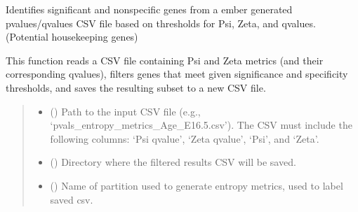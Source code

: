 \documentclass[letterpaper,10pt,english]{sphinxmanual}
\begin{document}
\begin{fulllineitems}
\label{\detokenize{ember_py:ember_py.top_genes.non_specific_to_partition}}
\pysigstartsignatures
\pysiglinewithargsret
{}
{\sphinxparamcomma {}\sphinxparamcomma {}\sphinxparamcomma {}\sphinxparamcomma {}\sphinxparamcomma {}}
{}
\pysigstopsignatures
\sphinxAtStartPar
Identifies significant and non\sphinxhyphen{}specific genes from a ember generated
p\sphinxhyphen{}values/q\sphinxhyphen{}values CSV file based on thresholds for Psi, Zeta, and q\sphinxhyphen{}values.
(Potential housekeeping genes)

\sphinxAtStartPar
This function reads a CSV file containing Psi and Zeta metrics (and their
corresponding q\sphinxhyphen{}values), filters genes that meet given significance and
specificity thresholds, and saves the resulting subset to a new CSV file.
\begin{quote}\begin{description}
\begin{itemize}
\item {} 
\sphinxAtStartPar
{} (\sphinxstyleliteralemphasis{\sphinxupquote{, }}) \textendash{} Path to the input CSV file (e.g., ‘pvals\_entropy\_metrics\_Age\_E16.5.csv’).
The CSV must include the following columns:
‘Psi q\sphinxhyphen{}value’, ‘Zeta q\sphinxhyphen{}value’, ‘Psi’, and ‘Zeta’.

\item {} 
\sphinxAtStartPar
{} (\sphinxstyleliteralemphasis{\sphinxupquote{, }}) \textendash{} Directory where the filtered results CSV will be saved.

\item {} 
\sphinxAtStartPar
{} () \textendash{} Name of partition used to generate entropy metrics, used to label saved csv.


\end{itemize}
\end{description}
\end{quote}
\end{fulllineitems}
\end{document}
